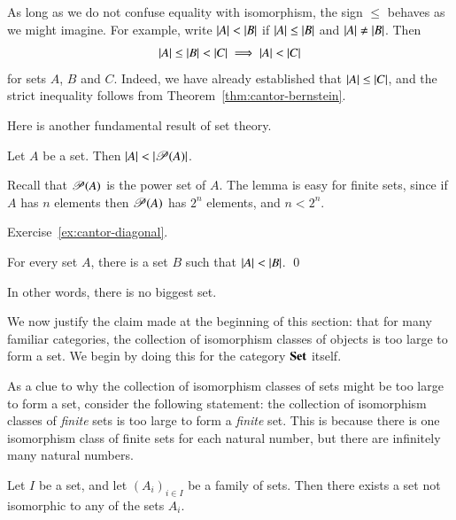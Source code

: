 As long as we do not confuse equality with isomorphism, the sign $\leq$
behaves as we might imagine.  For example, write $\left|A\right| < \left|B\right|$ if
$\left|A\right| \leq \left|B\right|$ and $\left|A\right| \neq \left|B\right|$.  Then
% 
\begin{equation}	
\label{eq:bernstein-impl}
\left|A\right| \leq \left|B\right| < \left|C\right| \implies \left|A\right| < \left|C\right|
\end{equation}
% 
for sets $A$, $B$ and $C$.  Indeed, we have already established that
$\left|A\right| \leq \left|C\right|$, and the strict inequality follows from
Theorem~\ref{thm:cantor-bernstein}.

Here is another fundamental result of set theory.

\begin{thm}[Cantor]  
\label{thm:cantor}
%
%
Let $A$ be a set.  Then $\left|A\right| < \left|\operatorname{\mathscr{P}}(A)\right|$.  
\end{thm}
% 
Recall that $\operatorname{\mathscr{P}}(A)$ is the power set of $A$.  The lemma is easy for finite
sets, since if $A$ has $n$ elements then $\operatorname{\mathscr{P}}(A)$ has $2^n$ elements, and
$n < 2^n$.

\begin{pf}
Exercise~\ref{ex:cantor-diagonal}.
\end{pf}

\begin{cor}     
\label{cor:no-biggest-set}
For every set $A$, there is a set $B$ such that $\left|A\right| < \left|B\right|$.
\qed
\end{cor}

In other words, there is no biggest set. 

We now justify the claim made at the beginning of this section: that for
many familiar categories, the collection of isomorphism classes of objects
is too large to form a set.  We begin by doing this for the category $\mathbf{Set}$
itself.  

As a clue to why the collection of isomorphism classes of sets might be too
large to form a set, consider the following statement: the collection of
isomorphism classes of \emph{finite} sets is too large to form a
\emph{finite} set.  This is because there is one isomorphism class of
finite sets for each natural number, but there are infinitely many natural
numbers.

\begin{propn}	
\label{propn:iso-classes-of-sets}
Let $I$ be a set, and let $(A_i)_{i \in I}$ be a family of sets.  Then there
exists a set not isomorphic to any of the sets $A_i$.
\end{propn}

